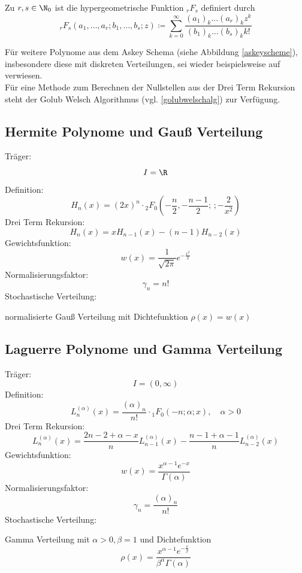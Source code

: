 \begin{mathdef}
Zu $r,s\in\N_0$ ist die hypergeometrische Funktion $_rF_s$ definiert durch
\[_rF_s(a_1,\dots,a_r;b_1,\dots,b_s;z)\coloneqq \sum_{k=0}^\infty \frac{(a_1)_k\dots (a_r)_kz^k}{(b_1)_k\dots(b_s)_kk!}\]
\end{mathdef}
Für weitere Polynome aus dem Askey Schema (siehe Abbildung \ref{askeyscheme}), insbesondere diese mit diskreten Verteilungen, sei wieder beispielsweise auf \autocite{dongbinxiu2010} verwiesen. \\
Für eine Methode zum Berechnen der Nullstellen aus der Drei Term Rekursion steht der Golub Welsch Algorithmus (vgl. \ref{golubwelschalg}) zur Verfügung.
\subsection{Hermite Polynome und Gauß Verteilung}
Träger:
\[I=\R\]
Definition:
\[H_n(x)=(2x)^n\cdot {_2F_0}\left(-\frac{n}{2},-\frac{n-1}{2};\, ;-\frac{2}{x^2}\right)\]
Drei Term Rekursion:
\[H_{n}(x)=xH_{n-1}(x)-(n-1)H_{n-2}(x)\]
Gewichtsfunktion:
\[w(x)=\frac{1}{\sqrt{2\pi}}e^{-\frac{x^2}{2}}\]
Normalisierungsfaktor:
\[\gamma_n=n!\]
Stochastische Verteilung:
\begin{center}
normalisierte Gauß Verteilung mit Dichtefunktion $\rho(x)=w(x)$
\end{center}

\subsection{Laguerre Polynome und Gamma Verteilung}
Träger:
\[I=(0,\infty)\]
Definition:
\[L_n^{(\alpha)}(x)=\frac{(\alpha)_n}{n!}\cdot {_1F_0}\left(-n;\alpha;x\right),\quad \alpha>0\]
Drei Term Rekursion:
\[L_{n}^{(\alpha)}(x)=\frac{2n-2+\alpha -x}{n}L_{n-1}^{(\alpha)}(x)-\frac{n-1+\alpha - 1}{n}L_{n-2}^{(\alpha)}(x)\]
Gewichtsfunktion:
\[w(x)=\frac{x^{\alpha-1}e^{-x}}{\Gamma(\alpha)}\]
Normalisierungsfaktor:
\[\gamma_n=\frac{(\alpha)_n}{n!}\]
Stochastische Verteilung:
\begin{center}
Gamma Verteilung mit $\alpha>0,\beta=1$ und Dichtefunktion
\[\rho(x)=\frac{x^{\alpha-1}e^{-\frac{x}{\beta}}}{\beta^{\alpha}\Gamma(\alpha)}\]
\end{center}

